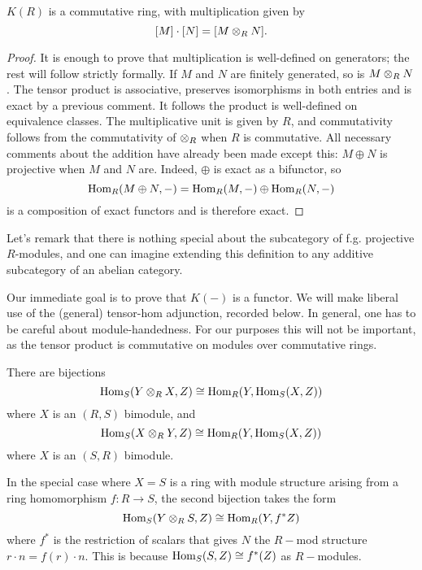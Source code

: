 \begin{lemma}
$K(R)$ is a commutative ring, with multiplication given by $$[M]\cdot [N]=[M\otimes_R N].$$
\end{lemma}
\begin{proof} It is enough to prove that multiplication is well-defined on generators; the rest will follow strictly formally. If $M$ and $N$ are finitely generated, so is $M\otimes_R N$. The tensor product is associative, preserves isomorphisms in both entries and is exact by a previous comment. It follows the product is well-defined on equivalence classes. The multiplicative unit is given by $R$, and commutativity follows from the commutativity of $\otimes_R$ when $R$ is commutative. All necessary comments about the addition have already been made except this: $M\oplus N$ is projective when $M$ and $N$ are. Indeed, $\oplus$ is exact as a bifunctor, so $$\text{Hom}_R(M\oplus N, -)=\text{Hom}_R(M,-)\oplus \text{Hom}_R(N,-)$$ is a composition of exact functors and is therefore exact.
\end{proof}

Let's remark that there is nothing special about the subcategory of f.g. projective $R$-modules, and one can imagine extending this definition to any additive subcategory of an abelian category.

Our immediate goal is to prove that $K(-)$ is a functor. We will make liberal use of the (general) tensor-hom adjunction, recorded below. In general, one has to be careful about module-handedness. For our purposes this will not be important, as the tensor product is commutative on modules over commutative rings.
\begin{lemma}
There are bijections
$$\text{Hom}_S(Y\otimes_R X,Z)\cong \text{Hom}_R(Y,\text{Hom}_S(X,Z))$$ where $X$ is an $(R,S)$ bimodule,
and
$$\text{Hom}_S(X\otimes_R Y,Z)\cong \text{Hom}_R(Y,\text{Hom}_S(X,Z))$$ where $X$ is an $(S,R)$ bimodule.
\end{lemma}

\begin{remark}
In the special case where $X=S$ is a ring with module structure arising from a ring homomorphism $f:R\rightarrow S$, the second bijection takes the form $$\text{Hom}_S(Y\otimes_R S,Z)\cong \text{Hom}_R(Y,f^*Z)$$ where $f^*$ is the restriction of scalars that gives $N$ the $R-$mod structure $r\cdot n=f(r)\cdot n$. This is because $\text{Hom}_S(S,Z)\cong f^*(Z)$ as $R-$modules.
\end{remark}

